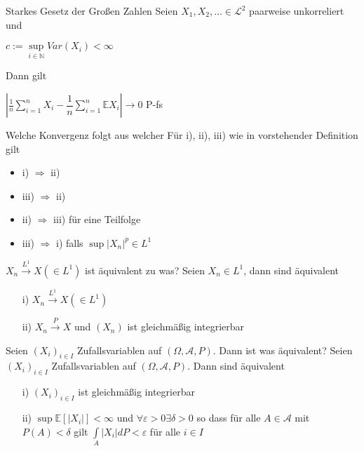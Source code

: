 \documentclass[avery5371,grid,frame]{flashcards} %
\newcommand{\E}{\mathbb{E}}
\newcommand{\1}{ \mathbb{1} } %
\begin{document}
\begin{flashcard}[Satz]{Starkes Gesetz der Großen Zahlen}
  Seien $X_1,X_2,\ldots \in \mathcal{L}^2$ paarweise unkorreliert und
  \begin{center}
    $c:=\sup\limits_{i \in \mathbb{N}} Var(X_i) < \infty$
  \end{center}
  Dann gilt
  \begin{center}
    $\left|\frac{1}{n}\sum\limits_{i=1}^nX_i-\dfrac{1}{n}\sum\limits_{i=1}^n\mathbb{E}X_i\right|
    \to 0$ P-fs
  \end{center}
\end{flashcard}

\begin{flashcard}[Satz]{Welche Konvergenz folgt aus welcher}
  Für i), ii), iii) wie in vorstehender Definition gilt
  \begin{itemize}
  \item i) $\Rightarrow$ ii)
  \item iii) $\Rightarrow$ ii)
  \item ii) $\Rightarrow$ iii) für eine Teilfolge
  \item iii) $\Rightarrow$ i) falls $\sup|X_n|^p \in L^1$
  \end{itemize}
\end{flashcard}

\begin{flashcard}[Satz]{$X_n \overset{L^1}{\to} X (\in L^1)$ ist äquivalent zu was?}
  \label{prop:LkonvergenzUndPkonvergenz}
  Seien $X_n \in L^1$, dann sind äquivalent
  \begin{itemize}
  \item[i)] $X_n \overset{L^1}{\to} X (\in L^1)$
  \item[ii)] $X_n \overset{P}{\to} X$ und $(X_n)$ ist gleichmäßig integrierbar
  \end{itemize}
\end{flashcard}

\begin{flashcard}[Satz]{  Seien $(X_i)_{i \in I}$ Zufallsvariablen auf
    $(\Omega, \mathcal{A},P)$. Dann ist was  äquivalent?}
  Seien $(X_i)_{i \in I}$ Zufallsvariablen auf $(\Omega, \mathcal{A},P)$. Dann sind
  äquivalent
  \begin{itemize}
  \item[i)] $(X_i)_{i \in I}$ ist gleichmäßig integrierbar
  \item[ii)] $\sup \E [|X_i|]< \infty$ und $\forall \varepsilon > 0
    \exists \delta >0$ so dass für alle $A \in \mathcal{A}$ mit $P(A)<
    \delta$ gilt $\int\limits_A |X_i|dP<\varepsilon$ für alle $i \in I$
  \end{itemize}
\end{flashcard}
\end{document}
